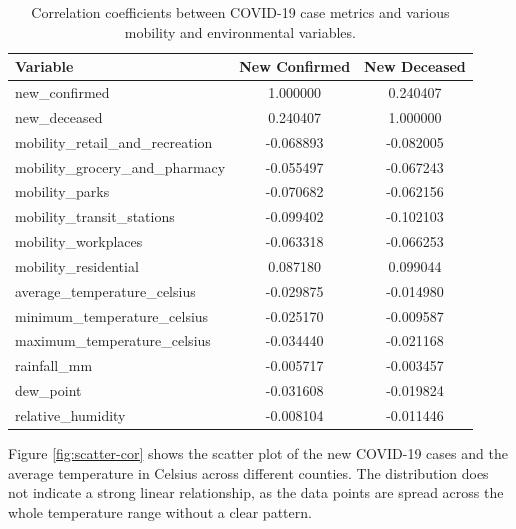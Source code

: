 \documentclass[sigconf,screen,nonacm]{acmart}
\begin{document}
\begin{table}[H]
\centering
\caption{Correlation coefficients between COVID-19 case metrics and various mobility and environmental variables.}
\begin{tabular}{lcc}
\hline
\textbf{Variable} & \textbf{New Confirmed} & \textbf{New Deceased} \\ \hline
new\_confirmed & 1.000000 & 0.240407 \\
new\_deceased & 0.240407 & 1.000000 \\
mobility\_retail\_and\_recreation & -0.068893 & -0.082005 \\
mobility\_grocery\_and\_pharmacy & -0.055497 & -0.067243 \\
mobility\_parks & -0.070682 & -0.062156 \\
mobility\_transit\_stations & -0.099402 & -0.102103 \\
mobility\_workplaces & -0.063318 & -0.066253 \\
mobility\_residential & 0.087180 & 0.099044 \\
average\_temperature\_celsius & -0.029875 & -0.014980 \\
minimum\_temperature\_celsius & -0.025170 & -0.009587 \\
maximum\_temperature\_celsius & -0.034440 & -0.021168 \\
rainfall\_mm & -0.005717 & -0.003457 \\
dew\_point & -0.031608 & -0.019824 \\
relative\_humidity & -0.008104 & -0.011446 \\ \hline
\end{tabular}
\label{tab:correlation}
\end{table}




Figure \ref{fig:scatter-cor} shows the scatter plot of the new COVID-19 cases and the average temperature in Celsius across different counties. The distribution does not indicate a strong linear relationship, as the data points are spread across the whole temperature range without a clear pattern. 
\end{document}
